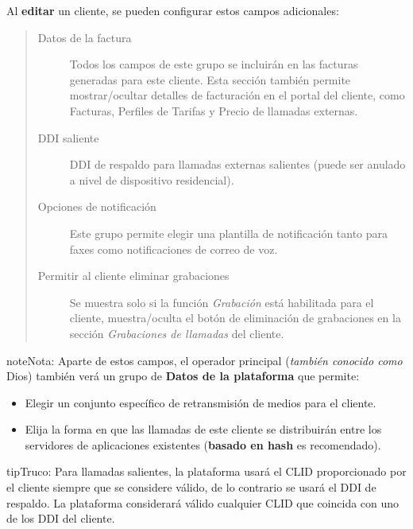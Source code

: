 \documentclass[letterpaper,10pt,spanish]{sphinxmanual}
\begin{document}
Al \textbf{editar} un cliente, se pueden configurar estos campos adicionales:
\begin{quote}
\begin{description}
\item[{Datos de la factura}] \leavevmode
Todos los campos de este grupo se incluirán en las facturas generadas para este cliente. Esta sección también permite mostrar/ocultar detalles de facturación en el portal del cliente, como Facturas, Perfiles de Tarifas y Precio de llamadas externas.

\item[{DDI saliente}] \leavevmode
DDI de respaldo para llamadas externas salientes (puede ser anulado a nivel de dispositivo residencial).

\item[{Opciones de notificación}] \leavevmode
Este grupo permite elegir una plantilla de notificación tanto para faxes como notificaciones de correo de voz.

\item[{Permitir al cliente eliminar grabaciones}] \leavevmode
Se muestra solo si la función \emph{Grabación} está habilitada para el cliente, muestra/oculta el botón de eliminación de grabaciones en la sección \emph{Grabaciones de llamadas} del cliente.

\end{description}
\end{quote}

\begin{notice}{note}{Nota:}
Aparte de estos campos, el operador principal (\emph{también conocido como} Dios) también verá un grupo de \textbf{Datos de la plataforma} que permite:
\begin{itemize}
\item {} 
Elegir un conjunto específico de retransmisión de medios para el cliente.

\item {} 
Elija la forma en que las llamadas de este cliente se distribuirán entre los servidores de aplicaciones existentes (\textbf{basado en hash} es recomendado).

\end{itemize}
\end{notice}

\begin{notice}{tip}{Truco:}
Para llamadas salientes, la plataforma usará el CLID proporcionado por el cliente siempre que se considere válido, de lo contrario se usará el DDI de respaldo. La plataforma considerará válido cualquier CLID que coincida con uno de los DDI del cliente.
\end{notice}
\end{document}
